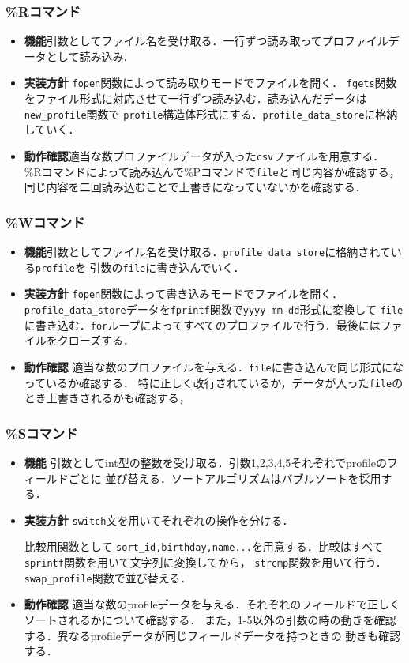 \subsubsection{\%Rコマンド}
\begin{itemize}
  \item \textbf{機能}引数としてファイル名を受け取る．一行ずつ読み取ってプロファイルデータとして読み込み．
  \item \textbf{実装方針} \texttt{fopen}関数によって読み取りモードでファイルを開く．
  \texttt{fgets}関数をファイル形式に対応させて一行ずつ読み込む．読み込んだデータは\texttt{new\_profile}関数で
  \texttt{profile}構造体形式にする．\texttt{profile\_data\_store}に格納していく．
  \item \textbf{動作確認}適当な数プロファイルデータが入った\texttt{csv}ファイルを用意する．
  \%Rコマンドによって読み込んで\%Pコマンドで\texttt{file}と同じ内容か確認する，
  同じ内容を二回読み込むことで上書きになっていないかを確認する．
\end{itemize}
\subsubsection{\%Wコマンド}
\begin{itemize}
  \item \textbf{機能}引数としてファイル名を受け取る．\texttt{profile\_data\_store}に格納されている\texttt{profile}を
  引数の\texttt{file}に書き込んでいく．
  \item \textbf{実装方針} \texttt{fopen}関数によって書き込みモードでファイルを開く．
  \texttt{profile\_data\_store}データを\texttt{fprintf}関数で\texttt{yyyy-mm-dd}形式に変換して
  \texttt{file}に書き込む．\texttt{for}ループによってすべてのプロファイルで行う．最後にはファイルをクローズする．
  \item \textbf{動作確認} 適当な数のプロファイルを与える．\texttt{file}に書き込んで同じ形式になっているか確認する．
  特に正しく改行されているか，データが入った\texttt{file}のとき上書きされるかも確認する，
\end{itemize}
\subsubsection{\%Sコマンド}
\begin{itemize}
  \item \textbf{機能} 引数としてint型の整数を受け取る．引数1,2,3,4,5それぞれでprofileのフィールドごとに
  並び替える．ソートアルゴリズムはバブルソートを採用する．
  \item \textbf{実装方針} \texttt{switch}文を用いてそれぞれの操作を分ける．
  
  比較用関数として
  \texttt{sort\_id,birthday,name...}を用意する．比較はすべて\texttt{sprintf}関数を用いて文字列に変換してから，
  \texttt{strcmp}関数を用いて行う．\texttt{swap\_profile}関数で並び替える．
  \item \textbf{動作確認} 適当な数のprofileデータを与える．それぞれのフィールドで正しくソートされるかについて確認する．
  また，1-5以外の引数の時の動きを確認する．異なるprofileデータが同じフィールドデータを持つときの
  動きも確認する．
\end{itemize}
\clearpage
